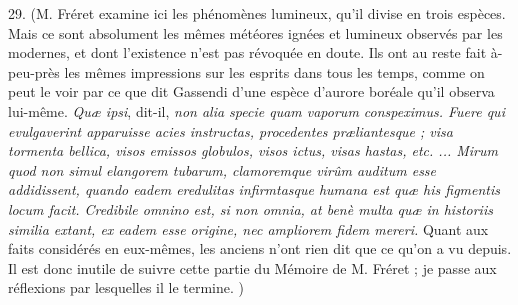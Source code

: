 \documentclass[a4paper, 11pt, oneside, polutonikogreek, french]{article}
\begin{document}
29. (M. Fréret examine ici les phénomènes lumineux, qu'il divise en trois espèces. Mais ce sont absolument les mêmes météores ignées et lumineux observés par les modernes, et dont l'existence n'est pas révoquée en doute. Ils ont au reste fait à-peu-près les mêmes impressions sur les esprits dans tous les temps, comme on peut le voir par ce que dit Gassendi d'une espèce d'aurore boréale qu'il observa lui-même. \og \emph{Quæ ipsi}, dit-il, \emph{non alia specie quam vaporum conspeximus. Fuere qui evulgaverint apparuisse acies instructas, procedentes præliantesque ; visa tormenta bellica, visos emissos globulos, visos ictus, visas hastas, etc. ... Mirum quod non simul elangorem tubarum, clamoremque virûm auditum esse addidissent, quando eadem eredulitas infirmtasque humana est quæ his figmentis locum facit. Credibile omnino est, si non omnia, at benè multa quæ in historiis similia extant, ex eadem esse origine, nec ampliorem fidem mereri.} \fg Quant aux faits considérés en eux-mêmes, les anciens n'ont rien dit que ce qu'on a vu depuis. Il est donc inutile de suivre cette partie du Mémoire de M. Fréret ; je passe aux réflexions par lesquelles il le termine. \fg)
\end{document}
